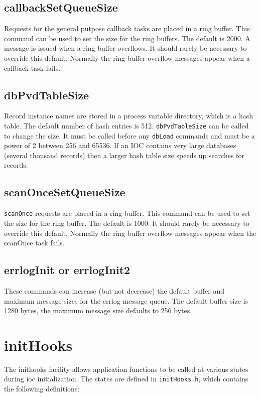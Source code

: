 \subsection{callbackSetQueueSize}

Requests for the general putpose callback tasks are placed in a ring buffer.
This command can be used to set the size for the ring buffers.
The default is 2000.
A message is issued when a ring buffer overflows.
It should rarely be necessary to override this default.
Normally the ring buffer overflow messages appear when a callback task fails.

\subsection{dbPvdTableSize}

Record instance names are stored in a process variable directory, which is a hash table.
The default number of hash entries is 512.
\verb|dbPvdTableSize| can be called to change the size.
It must be called before any \verb|dbLoad| commands and must be a power of 2 between 256 and 65536.
If an IOC contains very large databases (several thousand records) then a larger hash table size speeds up searches for records.

\subsection{scanOnceSetQueueSize}

\verb|scanOnce| requests are placed in a ring buffer.
This command can be used to set the size for the ring buffer.
The default is 1000.
It should rarely be necessary to override this default.
Normally the ring buffer overflow messages appear when the scanOnce task fails.

\subsection{errlogInit or errlogInit2}

These commands can increase (but not decrease) the default buffer and maximum message sizes for the errlog message queue.
The default buffer size is 1280 bytes, the maximum message size defaults to 256 bytes.

\section{initHooks}

The inithooks facility allows application functions to be called at various states during ioc initialization.
The states are defined in \verb|initHooks.h|, which contains the following definitions:

